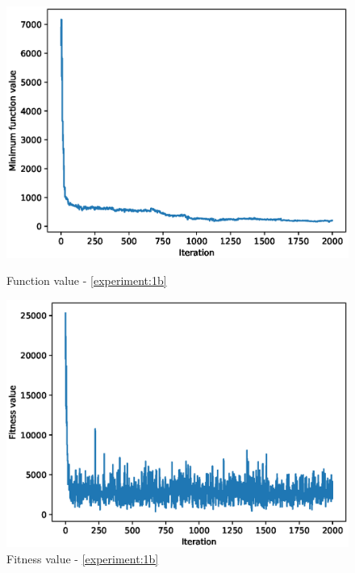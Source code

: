 \documentclass{article}
\begin{document}
\begin{figure}[!htbp]
	\centering
	\begin{minipage}{.48\textwidth}
		\centering
		\includegraphics[scale=.4]{experiment_1b_rosenbrock/min_eval_0.eps}
		\caption{Function value - \ref{experiment:1b}}
	\end{minipage}\hfill
	\begin{minipage}{.48\textwidth}
		\centering
		\includegraphics[scale=.4]{experiment_1b_rosenbrock/max_fitness_0.eps}
		\caption{Fitness value - \ref{experiment:1b}}
	\end{minipage}
\end{figure}
\FloatBarrier
\end{document}
